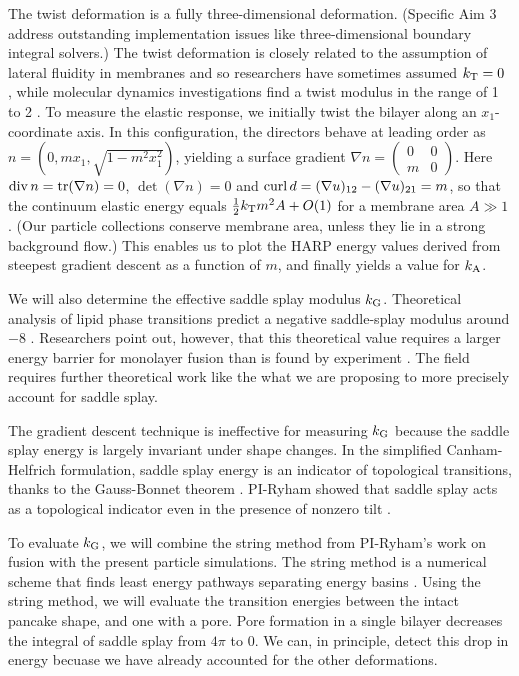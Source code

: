 The twist deformation is a fully three-dimensional deformation. 
(Specific Aim 3 address outstanding implementation issues like three-dimensional boundary integral solvers.) 
The twist deformation is closely related to the assumption of lateral fluidity in membranes and so researchers 
have sometimes assumed $k_{\mathrm{T}} = 0$ \cite{Hamm2000, 10.1063/1.4990404, https://doi.org/10.1039/C9SM02079A, 10.1103/PhysRevE.102.042406}, 
while molecular dynamics investigations find a twist modulus in the range of 1 to 2 \kBT \cite{LeVeWa14}.
To measure the elastic response,  we initially twist the bilayer along an $x_1$-coordinate axis.
In this configuration, the directors behave at leading order as $n = (0, mx_1, \sqrt{1 - m^2x_1^2})$,
yielding a surface gradient $\nabla n = \begin{pmatrix}0 & 0\\ m & 0\end{pmatrix}$. 
Here $\operatorname{div} n = \mathrm{tr}(\nabla n) = 0$, $\det(\nabla n) = 0$ and $\operatorname{curl} d = (\nabla u)_{12} - (\nabla u)_{21} = m$,
so that the continuum elastic energy equals $\tfrac{1}{2}k_{\mathrm{T}} m^2 A + O(1)$ for a membrane area $A \gg 1$. (Our particle collections
conserve membrane area, unless they lie in a strong background flow.) 
This enables us to plot the HARP energy values derived from steepest gradient descent as a function of $m$, and finally
yields a value for $k_{\mathrm{A}}$. 

We will also determine the effective saddle splay modulus $k_{\mathrm{G}}$. 
Theoretical analysis of lipid phase transitions predict a negative saddle-splay modulus around $-8$ \kBT\;
\cite{SIEGEL2004366,SIEGEL20085200}. Researchers point out, however, that this theoretical value requires a larger energy 
barrier for monolayer fusion than is found by experiment \cite{FrRoPi17,Tran7106,TerziDeserno17}. 
The field requires further theoretical work like the what we are proposing to more precisely account for saddle splay.
  
The gradient descent technique is ineffective for measuring $k_{\mathrm{G}}$ because
the saddle splay energy is largely invariant under shape changes.
In the simplified Canham-Helfrich formulation, saddle splay energy is an indicator of topological transitions, thanks to the  Gauss-Bonnet theorem
\cite{TerziDeserno17}.
PI-Ryham showed that saddle splay acts as a topological indicator even in the presence of nonzero tilt \cite{RyKlYaCo16}. 

To evaluate $k_{\mathrm{G}}$, we will combine the string method from PI-Ryham's work on fusion \cite{RyKlYaCo16} with
the present particle simulations. The string method is a numerical scheme that finds
least energy pathways separating energy basins \cite{simple_string}.
Using the string method, we will evaluate the transition energies between the intact pancake shape,
and one with a pore. Pore formation in a single bilayer decreases the integral of saddle splay from $4\pi$
to $0$. We can, in principle, detect this drop in energy becuase we have already accounted for the other deformations. 

